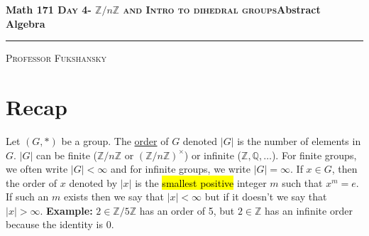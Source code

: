 \documentclass[12pt]{report}
\newcommand{\examples}[1]{{\leavevmode\color{Maroon} #1}}
\newcommand{\recap}[1]{{\leavevmode\color{teal} #1}}
\begin{document}
	\begin{center} 
		\textbf{Math 171  \hfill  \textsc{Day 4- $\mathbb{Z}/n\mathbb{Z}$ and Intro to dihedral groups}\hfill Abstract Algebra}
		\rule{\linewidth}{.01in}
		\vskip 0.01in
	\end{center}
	\textsc{Professor Fukshansky}\\
	\vskip 0.05in
	\section{Recap}
	\recap{
	Let $(G,*)$ be a group. The \underline{order} of $G$ denoted $|G|$ is the number of elements in $G$. $|G|$ can be finite ($\mathbb{Z}/n\mathbb{Z}$ or $(\mathbb{Z}/n\mathbb{Z})^\times$) or infinite ($\mathbb{Z},\mathbb{Q}, \dots$). For finite groups, we often write $|G|<\infty$ and for infinite groups, we write $|G|=\infty$. 
	\vskip 0.05in
	If $x\in G$, then the order of $x$ denoted by $|x|$ is the \hl{smallest positive} integer $m$ such that $x^m=e$. If such an $m$ exists then we say that $|x|<\infty$ but if it doesn't we say that $|x|>\infty$. 
	}
	\vskip 0.05in
	\examples{
		\textbf{Example: } $2\in \mathbb{Z}/5\mathbb{Z}$ has an order of 5, but $2\in \mathbb{Z}$ has an infinite order because the identity is 0. 
	}
\end{document}
